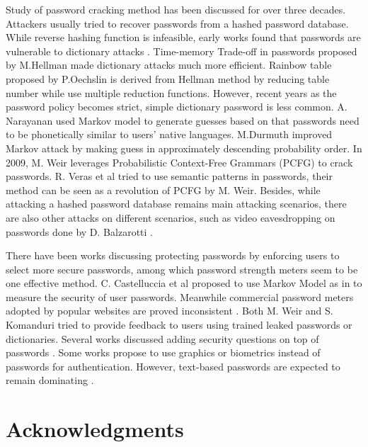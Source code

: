 \documentclass{sig-alternate}
\begin{document}
Study of password cracking method has been discussed for over three decades. Attackers usually tried to recover passwords from a hashed password database. While reverse hashing function is infeasible, early works found that passwords are vulnerable to dictionary attacks \cite{morris1979password}. Time-memory Trade-off in passwords proposed by M.Hellman \cite{hellman1980cryptanalytic} made dictionary attacks much more efficient. Rainbow table proposed by P.Oechslin \cite{oechslin2003making} is derived from Hellman method \cite{hellman1980cryptanalytic} by reducing table number while use multiple reduction functions. However, recent years as the password policy becomes strict, simple dictionary password is less common. A. Narayanan \cite{narayanan2005fast} used Markov model to generate guesses based on that passwords need to be phonetically similar to users' native languages. M.Durmuth \cite{castelluccia2013privacy} improved Markov attack by making guess in approximately descending probability order. In 2009, M. Weir \cite{weir2009password} leverages Probabilistic Context-Free Grammars (PCFG) to crack passwords. R. Veras et al\cite{veras2014semantic} tried to use semantic patterns in passwords, their method can be seen as a revolution of PCFG by M. Weir. Besides, while attacking a hashed password database remains main attacking scenarios, there are also other attacks on different scenarios, such as video eavesdropping on passwords done by D. Balzarotti \cite{balzarotti2008clearshot}.

There have been works discussing protecting passwords by enforcing users to select more secure passwords, among which password strength meters seem to be one effective method. C. Castelluccia et al \cite{castelluccia2012adaptive} proposed to use Markov Model as in \cite{narayanan2005fast} to measure the security of user passwords. Meanwhile commercial password meters adopted by popular websites are proved inconsistent \cite{de2014very}. Both M. Weir \cite{weir2010testing} and S. Komanduri \cite{komanduri2014telepathwords} tried to provide feedback to users using trained leaked passwords or dictionaries. Several works discussed adding security questions on top of passwords \cite{pinkas2002securing}\cite{schechter2009s}\cite{brainard2006fourth}. Some works propose to use graphics \cite{davis2004user}\cite{jermyn1999design} or biometrics \cite{jain2006biometrics} instead of passwords for authentication. However, text-based passwords are expected to remain dominating \cite{bonneau2012quest}.

\section{Acknowledgments}
\end{document}
